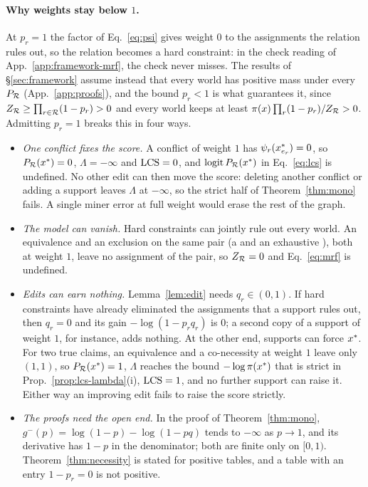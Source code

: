 \paragraph{Why weights stay below $1$.}
\label{app:weights}
At $p_r=1$ the factor of Eq.~\ref{eq:psi} gives weight $0$ to the assignments the relation rules
out, so the relation becomes a hard constraint: in the check reading of
App.~\ref{app:framework-mrf}, the check never misses. The results of \S\ref{sec:framework} assume
instead that every world has positive mass under every $P_{\mathcal{R}}$ (App.~\ref{app:proofs}), and the bound
$p_r<1$ is what guarantees it, since $Z_{\mathcal{R}}\ge\prod_{r\in\mathcal{R}}(1-p_r)>0$ and every world keeps at least
$\pi(x)\prod_{r}(1-p_r)/Z_{\mathcal{R}}>0$. Admitting $p_r=1$ breaks this in four ways.
\begin{itemize}[leftmargin=1.2em,itemsep=1pt,topsep=2pt]
\item \emph{One conflict fixes the score.} A conflict of weight $1$ has $\psi_r(x^{\ast}_{e_r})=0$, so
  $P_{\mathcal{R}}(x^{\ast})=0$, $\Lambda=-\infty$ and $\mathrm{LCS}=0$, and $\operatorname{logit}P_{\mathcal{R}}(x^{\ast})$ in
  Eq.~\ref{eq:lcs} is undefined. No other edit can then move the score: deleting another conflict
  or adding a support leaves $\Lambda$ at $-\infty$, so the strict half of
  Theorem~\ref{thm:mono} fails. A single miner error at full weight would erase the rest of the
  graph.
\item \emph{The model can vanish.} Hard constraints can jointly rule out every world. An
  equivalence and an exclusion on the same pair (a  and an exhaustive
  ), both at weight $1$, leave no assignment of the pair, so $Z_{\mathcal{R}}=0$ and
  Eq.~\ref{eq:mrf} is undefined.
\item \emph{Edits can earn nothing.} Lemma~\ref{lem:edit} needs $q_r\in(0,1)$. If hard constraints
  have already eliminated the assignments that a support rules out, then $q_r=0$ and its gain
  $-\log(1-p_rq_r)$ is $0$; a second copy of a support of weight $1$, for instance, adds nothing.
  At the other end, supports can force $x^{\ast}$. For two true claims, an equivalence and a
  co-necessity at weight $1$ leave only $(1,1)$, so $P_{\mathcal{R}}(x^{\ast})=1$, $\Lambda$ reaches the bound
  $-\log\pi(x^{\ast})$ that is strict in Prop.~\ref{prop:lcs-lambda}(i), $\mathrm{LCS}=1$, and no further
  support can raise it. Either way an improving edit fails to raise the score strictly.
\item \emph{The proofs need the open end.} In the proof of Theorem~\ref{thm:mono},
  $g^-(p)=\log(1-p)-\log(1-pq)$ tends to $-\infty$ as $p\to1$, and its derivative has $1-p$ in the
  denominator; both are finite only on $[0,1)$. Theorem~\ref{thm:necessity} is stated for positive
  tables, and a table with an entry $1-p_r=0$ is not positive.
\end{itemize}
